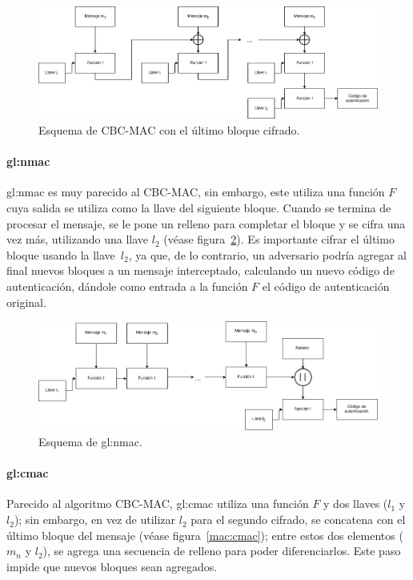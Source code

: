 \begin{figure}
  \begin{center}
    \includegraphics[width=0.9\linewidth]{diagramas/cbcmaclb.png}
    \caption{Esquema de CBC-MAC con el último bloque cifrado.}
    \label{mac:cbc2}
  \end{center}
\end{figure}

\paragraph{\acrlong{gl:nmac}}
\gls{gl:nmac} es muy parecido al CBC-MAC, sin embargo, este utiliza una
función $F$ cuya salida se utiliza como la llave del siguiente bloque. Cuando
se termina de procesar el mensaje, se le pone un relleno para completar el
bloque y se cifra una vez más, utilizando una llave $l_2$ (véase
figura~\ref{mac:nmac}). Es importante cifrar el último bloque usando la
llave~$l_2$, ya que, de lo contrario, un adversario podría agregar al final
nuevos bloques a un mensaje interceptado, calculando un nuevo código de
autenticación, dándole como entrada a la función $F$ el código de autenticación
original.

\begin{figure}
  \begin{center}
    \includegraphics[width=0.9\linewidth]{diagramas/nmac.png}
    \caption{Esquema de \gls{gl:nmac}.}
    \label{mac:nmac}
  \end{center}
\end{figure}

\paragraph{\acrlong{gl:cmac}}
Parecido al algoritmo CBC-MAC, \gls{gl:cmac} utiliza una función $F$ y dos
llaves ($l_1$ y $l_2$); sin embargo, en vez de utilizar $l_2$ para el segundo
cifrado, se concatena con el último bloque del mensaje (véase
figura~\ref{mac:cmac}); entre estos dos elementos ($m_n$ y $l_2$), se agrega una
secuencia de relleno para poder diferenciarlos. Este paso impide que nuevos
bloques sean agregados.

